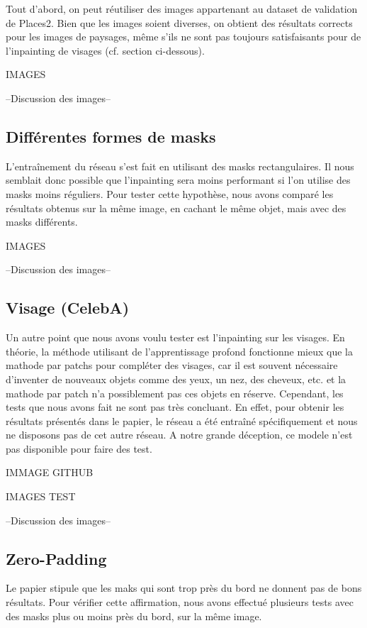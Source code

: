 \documentclass[12pt]{article}
\begin{document}
Tout d'abord, on peut réutiliser des images appartenant au dataset de validation de Places2. Bien que les images soient diverses, on obtient des résultats corrects pour les images de paysages, même s'ils ne sont pas toujours satisfaisants pour de l'inpainting de visages (cf. section ci-dessous).

IMAGES

--Discussion des images--

\subsection{Différentes formes de masks}

L'entraînement du réseau s'est fait en utilisant des masks rectangulaires. Il nous semblait donc possible que l'inpainting sera moins performant si l'on utilise des masks moins réguliers. Pour tester cette hypothèse, nous avons comparé les résultats obtenus sur la même image, en cachant le même objet, mais avec des masks différents.

IMAGES

--Discussion des images--

\subsection{Visage (CelebA)}

Un autre point que nous avons voulu tester est l'inpainting sur les visages. En théorie, la méthode utilisant de l'apprentissage profond fonctionne mieux que la mathode par patchs pour compléter des visages, car il est souvent nécessaire d'inventer de nouveaux objets comme des yeux, un nez, des cheveux, etc. et la mathode par patch n'a possiblement pas ces objets en réserve. Cependant, les tests que nous avons fait ne sont pas très concluant. En effet, pour obtenir les résultats présentés dans le papier, le réseau a été entraîné spécifiquement et nous ne disposons pas de cet autre réseau. A notre grande déception, ce modele n'est pas disponible pour faire des test.

IMMAGE GITHUB

IMAGES TEST

--Discussion des images--

\subsection{Zero-Padding}

Le papier stipule que les maks qui sont trop près du bord ne donnent pas de bons résultats. Pour vérifier cette affirmation, nous avons effectué plusieurs tests avec des masks plus ou moins près du bord, sur la même image.
\end{document}
